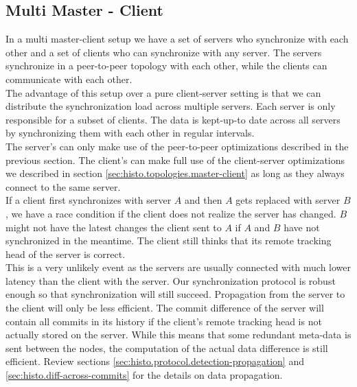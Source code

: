 \subsection{Multi Master - Client}
In a multi master-client setup we have a set of servers who synchronize with each other and a set of clients who can synchronize with any server.
The servers synchronize in a peer-to-peer topology with each other, while the clients can communicate with each other.\\
The advantage of this setup over a pure client-server setting is that we can distribute the synchronization load across multiple servers.
Each server is only responsible for a subset of clients.
The data is kept-up-to date across all servers by synchronizing them with each other in regular intervals.\\
The server's can only make use of the peer-to-peer optimizations described in the previous section.
The client's can make full use of the client-server optimizations we described in section \ref{sec:histo.topologies.master-client} as long as they always connect to the same server.\\
If a client first synchronizes with server $ A $ and then $ A $ gets replaced with server $ B $, we have a race condition if the client does not realize the server has changed.
$ B $ might not have the latest changes the client sent to $ A $ if $ A $ and $ B $ have not synchronized in the meantime.
The client still thinks that its remote tracking head of the server is correct.\\
This is a very unlikely event as the servers are usually connected with much lower latency than the client with the server.
Our synchronization protocol is robust enough so that synchronization will still succeed.
Propagation from the server to the client will only be less efficient.
The commit difference of the server will contain all commits in its history if the client's remote tracking head is not actually stored on the server.
While this means that some redundant meta-data is sent between the nodes, the computation of the actual data difference is still efficient.
Review sections \ref{sec:histo.protocol.detection-propagation} and \ref{sec:histo.diff-across-commits} for the details on data propagation.

